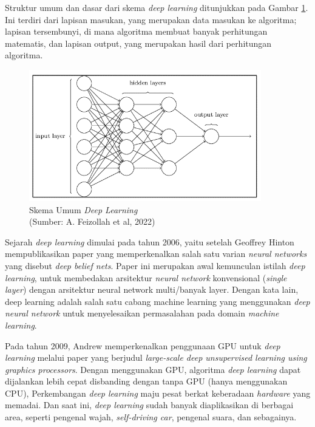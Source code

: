 Struktur umum dan dasar dari skema \textit{deep learning} ditunjukkan pada Gambar \ref{img:Skema-Umum-Deep-Learning}. Ini terdiri dari lapisan masukan, yang merupakan data masukan ke algoritma; lapisan tersembunyi, di mana algoritma membuat banyak perhitungan matematis, dan lapisan output, yang merupakan hasil dari perhitungan algoritma.

\begin{figure}[H]
	\vspace{-0.1cm}
	\begin{center}
		\includegraphics[width=1\columnwidth]{bab2/Gambar/Picture12.png}
	\end{center}
	\vspace{-0.2cm}
	\captionsetup{justification=centering}
	\caption{Skema Umum \textit{Deep Learning}\\(Sumber: A. Feizollah et al, 2022)}\label{img:Skema-Umum-Deep-Learning}
\end{figure}
Sejarah \textit{deep learning} dimulai pada tahun 2006, yaitu setelah Geoffrey Hinton mempublikasikan paper yang memperkenalkan salah satu varian \textit{neural networks} yang disebut \textit{deep belief nets}. Paper ini merupakan awal kemunculan istilah \textit{deep learning}, untuk membedakan arsitektur \textit{neural network} konvensional (\textit{single layer}) dengan arsitektur neural network multi/banyak layer. Dengan kata lain, deep learning adalah salah satu cabang machine learning yang menggunakan \textit{deep neural network} untuk menyelesaikan permasalahan pada domain \textit{machine learning}. 

Pada tahun 2009, Andrew memperkenalkan penggunaan GPU untuk \textit{deep learning} melalui paper yang berjudul \textit{large-scale deep unsupervised learning using graphics processors}. Dengan menggunakan GPU, algoritma \textit{deep learning} dapat dijalankan lebih cepat disbanding dengan tanpa GPU (hanya menggunakan CPU), Perkembangan \textit{deep learning} maju pesat berkat keberadaan \textit{hardware} yang memadai. Dan saat ini, \textit{deep learning} sudah banyak diaplikasikan di berbagai area, seperti pengenal wajah, \textit{self-driving car}, pengenal suara, dan sebagainya. 

